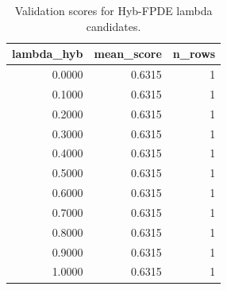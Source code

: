 \begin{table}[t]
\caption{Validation scores for Hyb-FPDE lambda candidates.}
\label{tab:lambda_distribution_computed}
\centering
\begin{tabular}{rrr}
\toprule
lambda\_hyb & mean\_score & n\_rows \\
\midrule
0.0000 & 0.6315 & 1 \\
0.1000 & 0.6315 & 1 \\
0.2000 & 0.6315 & 1 \\
0.3000 & 0.6315 & 1 \\
0.4000 & 0.6315 & 1 \\
0.5000 & 0.6315 & 1 \\
0.6000 & 0.6315 & 1 \\
0.7000 & 0.6315 & 1 \\
0.8000 & 0.6315 & 1 \\
0.9000 & 0.6315 & 1 \\
1.0000 & 0.6315 & 1 \\
\bottomrule
\end{tabular}

\end{table}
